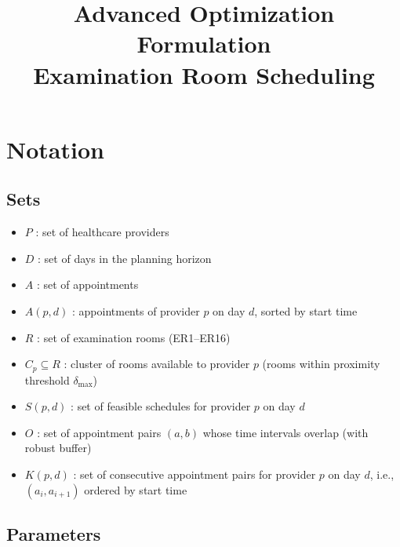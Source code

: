 \documentclass[12pt]{article}
\title{Advanced Optimization Formulation \\ Examination Room Scheduling}
\author{}
\date{}
\begin{document}
\maketitle

\section{Notation}

\subsection*{Sets}

\begin{itemize}
\item $P$ : set of healthcare providers
\item $D$ : set of days in the planning horizon
\item $A$ : set of appointments
\item $A(p,d)$ : appointments of provider $p$ on day $d$, sorted by start time
\item $R$ : set of examination rooms (ER1--ER16)
\item $C_p \subseteq R$ : cluster of rooms available to provider $p$ (rooms within proximity threshold $\delta_{\max}$)
\item $S(p,d)$ : set of feasible schedules for provider $p$ on day $d$
\item $O$ : set of appointment pairs $(a,b)$ whose time intervals overlap (with robust buffer)
\item $K(p,d)$ : set of consecutive appointment pairs for provider $p$ on day $d$, i.e., $(a_i, a_{i+1})$ ordered by start time
\end{itemize}

\subsection*{Parameters}
\end{document}
